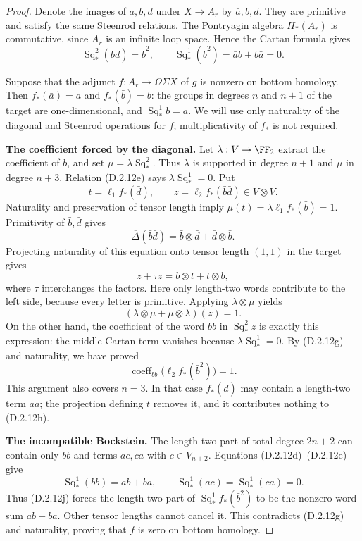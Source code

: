 \begin{proof}
Denote the images of $a,b,d$ under $X\to A_r$ by
$\bar a,\bar b,\bar d$. They are primitive and satisfy the
same Steenrod relations. The Pontryagin algebra $H_*(A_r)$
is commutative, since $A_r$ is an infinite loop space. Hence
the Cartan formula gives
\[
 \operatorname{Sq}_*^2(\bar b\bar d)=\bar b^2,
 \qquad
 \operatorname{Sq}_*^1(\bar b^2)
   =\bar a\bar b+\bar b\bar a=0.
 \tag{D.2.12g}
\]

Suppose that the adjunct $f:A_r\to\Omega\Sigma X$ of $g$
is nonzero on bottom homology. Then $f_*(\bar a)=a$ and
$f_*(\bar b)=b$: the groups in degrees $n$ and $n+1$ of
the target are one-dimensional, and
$\operatorname{Sq}_*^1b=a$. We will use only naturality of
the diagonal and Steenrod operations for $f$; multiplicativity
of $f_*$ is not required.

\medskip\noindent
\textbf{The coefficient forced by the diagonal.}
Let $\lambda:V\to\FF_2$ extract the coefficient of $b$,
and set $\mu=\lambda\operatorname{Sq}_*^2$.
Thus $\lambda$ is supported in degree $n+1$ and $\mu$ in
degree $n+3$. Relation \textup{(D.2.12e)} says
$\lambda\operatorname{Sq}_*^1=0$.
Put
\[
 t=\ell_1f_*(\bar d),\qquad
 z=\ell_2f_*(\bar b\bar d)\in V\otimes V.
\]
Naturality and preservation of tensor length imply
$\mu(t)=\lambda\ell_1f_*(\bar b)=1$.
Primitivity of $\bar b,\bar d$ gives
\[
 \overline\Delta(\bar b\bar d)
    =\bar b\otimes\bar d+\bar d\otimes\bar b.
\]
Projecting naturality of this equation onto tensor length
$(1,1)$ in the target gives
\[
 z+\tau z=b\otimes t+t\otimes b,
 \tag{D.2.12h}
\]
where $\tau$ interchanges the factors. Here only length-two
words contribute to the left side, because every letter is
primitive. Applying $\lambda\otimes\mu$ yields
\[
 (\lambda\otimes\mu+\mu\otimes\lambda)(z)=1.
 \tag{D.2.12i}
\]
On the other hand, the coefficient of the word $bb$ in
$\operatorname{Sq}_*^2z$ is exactly this expression: the
middle Cartan term vanishes because
$\lambda\operatorname{Sq}_*^1=0$. By
\textup{(D.2.12g)} and naturality, we have proved
\[
 \operatorname{coeff}_{bb}\bigl(\ell_2f_*(\bar b^2)\bigr)=1.
 \tag{D.2.12j}
\]
This argument also covers $n=3$. In that case $f_*(\bar d)$
may contain a length-two term $aa$; the projection defining
$t$ removes it, and it contributes nothing to
\textup{(D.2.12h)}.

\medskip\noindent
\textbf{The incompatible Bockstein.}
The length-two part of total degree $2n+2$ can contain only
$bb$ and terms $ac,ca$ with $c\in V_{n+2}$. Equations
\textup{(D.2.12d)--(D.2.12e)} give
\[
 \operatorname{Sq}_*^1(bb)=ab+ba,\qquad
 \operatorname{Sq}_*^1(ac)=
 \operatorname{Sq}_*^1(ca)=0.
\]
Thus \textup{(D.2.12j)} forces the length-two part of
$\operatorname{Sq}_*^1f_*(\bar b^2)$ to be the nonzero word
sum $ab+ba$. Other tensor lengths cannot cancel it. This
contradicts \textup{(D.2.12g)} and naturality, proving that
$f$ is zero on bottom homology.


\end{proof}

